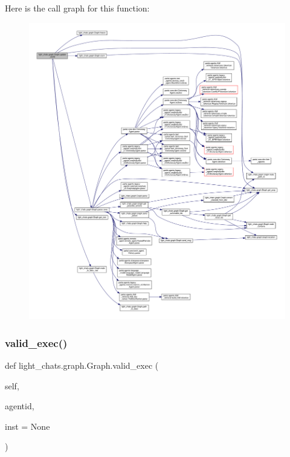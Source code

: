 Here is the call graph for this function\+:
\nopagebreak
\begin{figure}[H]
\begin{center}
\leavevmode
\includegraphics[width=350pt]{classlight__chats_1_1graph_1_1Graph_ab4e757d18538326e65b8ed2dce71d9fa_cgraph}
\end{center}
\end{figure}
\mbox{\label{classlight__chats_1_1graph_1_1Graph_accd7dfd84e4f2bee3fc3fbac8d8577cd}} 
\subsubsection{\texorpdfstring{valid\+\_\+exec()}{valid\_exec()}}
{\footnotesize\ttfamily def light\+\_\+chats.\+graph.\+Graph.\+valid\+\_\+exec (\begin{DoxyParamCaption}\item[{}]{self,  }\item[{}]{agentid,  }\item[{}]{inst = {\ttfamily None} }\end{DoxyParamCaption})}



